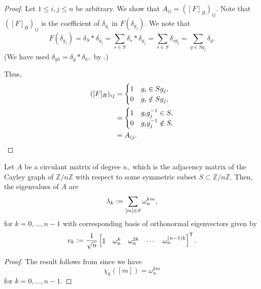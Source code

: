 \begin{proof}
    Let $1 \le i, j \le n$ be arbitrary. We show that $A_{ij} = ([F]_B)_{ij}.$ Note that $([F]_B)_{ij}$ is the coefficient of $\delta_{g_i}$ in $F(\delta_{g_j}).$ We note that
    \begin{equation*} 
        F(\delta_{g_j}) = \delta_S * \delta_{g_j} = \sum_{s \in S}\delta_s * \delta_{g_j} = \sum_{s \in S} \delta_{sg_j} = \sum_{g \in Sg_j} \delta_g.
    \end{equation*}
    (We have used $\delta_{gh} = \delta_g * \delta_h,$ by .)

    Thus, 
    \begin{align*} 
        ([F]_B)_{ij} &= \begin{cases}
            1 & g_i \in Sg_j,\\
            0 & g_i \notin Sg_j,
        \end{cases}\\
        &= \begin{cases}
            1 & g_ig_j^{-1} \in S,\\
            0 & g_ig_j^{-1} \notin S,
        \end{cases}\\
        &= A_{ij}. \qedhere
    \end{align*}
\end{proof}

\begin{cor}
    Let $A$ be a circulant matrix of degree $n,$ which is the adjacency matrix of the Cayley graph of $\mathbb{Z}/n\mathbb{Z}$ with respect to some symmetric subset $S \subset \mathbb{Z}/n\mathbb{Z}.$ Then, the eigenvalues of $A$ are
    \begin{equation*} 
        \lambda_k \vcentcolon= \sum_{[m] \in S} \omega_n^{km},
    \end{equation*}
    for $k = 0, \ldots, n - 1$ with corresponding basis of orthonormal eigenvectors given by
    \begin{equation*} 
        v_k \vcentcolon= \frac{1}{\sqrt{n}}\begin{bmatrix}
            1 & \omega_n^{k} & \omega_n^{2k} & \cdots & \omega_n^{(n - 1)k}
        \end{bmatrix}^\mathsf{T}.
    \end{equation*}
\end{cor}
\begin{proof} 
    The result follows from  since we have
    \begin{equation*} 
        \chi_k([m]) = \omega_n^{km}
    \end{equation*}
    for $k = 0, \ldots, n - 1.$ 
\end{proof}


